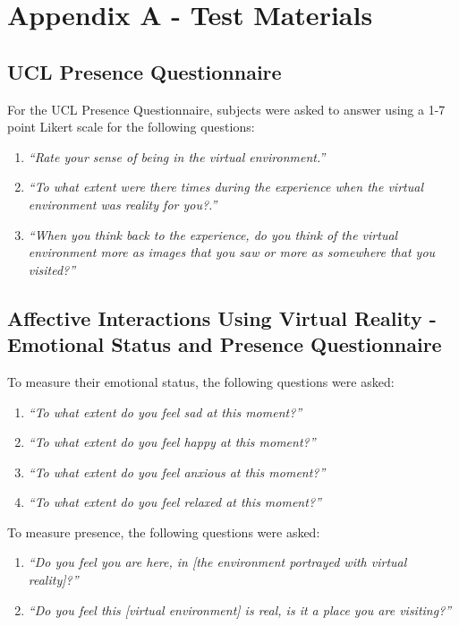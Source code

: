 \documentclass{sigchi}
\newcommand{\inlinequote}[1]{\textit{``#1''}}
\begin{document}
\balance{}




\appendix
\section{Appendix A - Test Materials}\label{Appendix_A}
\subsection{UCL Presence Questionnaire}
For the UCL Presence Questionnaire, subjects were asked to answer using a 1-7 point Likert scale for the following questions:
\begin{enumerate}
	\item{\inlinequote{Rate your sense of being in the virtual environment.}}
	\item{\inlinequote{To what extent were there times during the experience when the virtual environment was reality for you?.}}
	\item{\inlinequote{When you think back to the experience, do you think of the virtual environment more as images that you saw or more	as somewhere that you visited?}}
	\end{enumerate}

\subsection{Affective Interactions Using Virtual Reality - Emotional Status and Presence Questionnaire}
To measure their emotional status, the following questions were asked:
\begin{enumerate}
	\item{\inlinequote{To what extent do you feel sad at this moment?}}
	\item{\inlinequote{To what extent do you feel happy at this	moment?}}
	\item{\inlinequote{To what extent do you feel anxious at this moment?}}
	\item{\inlinequote{To what extent do you feel relaxed at this moment?}}
\end{enumerate}

To measure presence, the following questions were asked:
\begin{enumerate}
	\item{\inlinequote{Do you feel you are here, in [the environment portrayed with virtual reality]?}}
	\item{\inlinequote{Do you feel this [virtual environment] is real, is it a place you are visiting?}}
\end{enumerate}
\end{document}
